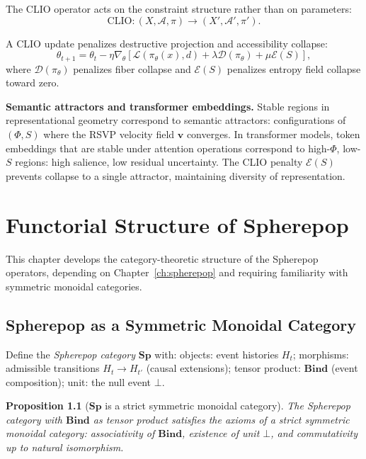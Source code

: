 \documentclass[11pt, openright, twoside]{book}
\theoremstyle{plain}
\newtheorem{proposition}[theorem]{Proposition}
\theoremstyle{definition}
\theoremstyle{remark}
\newcommand{\vfield}{\mathbf{v}}
\newcommand{\Sfield}{S}
\newcommand{\Bind}{\mathbf{Bind}}
\newcommand{\Admiss}{\mathcal{A}}
\newcommand{\Traj}{X}
\newcommand{\proj}{\pi}
\begin{document}
The CLIO operator acts on the constraint structure rather than on parameters:
\begin{equation}
  \mathrm{CLIO}:(\Traj,\Admiss,\proj)\to(\Traj',\Admiss',\proj').
\end{equation}

A CLIO update penalizes destructive projection and accessibility collapse:
\begin{equation}
  \theta_{t+1} = \theta_t - \eta\nabla_\theta\!\left[
  \mathcal{L}(\proj_\theta(x),d)
  + \lambda\mathcal{D}(\proj_\theta)
  + \mu\mathcal{E}(\Sfield)\right],
\end{equation}
where $\mathcal{D}(\proj_\theta)$ penalizes fiber collapse and $\mathcal{E}(\Sfield)$
penalizes entropy field collapse toward zero.

\begin{implbox}
\textbf{Semantic attractors and transformer embeddings.} Stable regions in representational
geometry correspond to semantic attractors: configurations of $(\Phi,\Sfield)$ where the
RSVP velocity field $\vfield$ converges. In transformer models, token embeddings that are
stable under attention operations correspond to high-$\Phi$, low-$\Sfield$ regions:
high salience, low residual uncertainty. The CLIO penalty $\mathcal{E}(\Sfield)$ prevents
collapse to a single attractor, maintaining diversity of representation.
\end{implbox}

\chapter{Functorial Structure of Spherepop}

\begin{depbox}
This chapter develops the category-theoretic structure of the Spherepop operators, depending
on Chapter~\ref{ch:spherepop} and requiring familiarity with symmetric monoidal categories.
\end{depbox}

\section{Spherepop as a Symmetric Monoidal Category}

Define the \emph{Spherepop category} $\mathbf{Sp}$ with:
objects: event histories $H_t$;
morphisms: admissible transitions $H_t\to H_{t'}$ (causal extensions);
tensor product: $\Bind$ (event composition);
unit: the null event $\bot$.

\begin{proposition}[$\mathbf{Sp}$ is a strict symmetric monoidal category]
The Spherepop category with $\Bind$ as tensor product satisfies the axioms of a strict
symmetric monoidal category: associativity of $\Bind$, existence of unit $\bot$, and
commutativity up to natural isomorphism.
\end{proposition}
\end{document}
